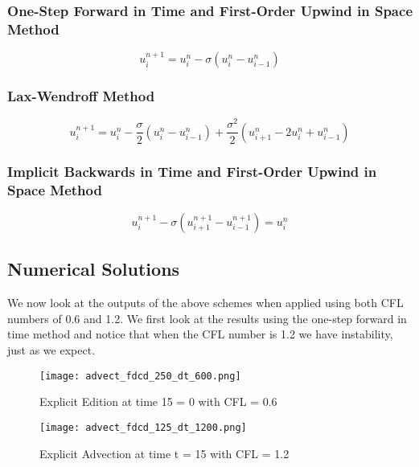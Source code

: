 \documentclass[a4paper,12pt,titlepage]{article}
\newcommand{\scale}{0.5}
\begin{document}
\subsubsection{One-Step Forward in Time and First-Order Upwind in Space Method}
\begin{equation}
u_{i}^{n+1} = u_{i}^n - \sigma (u_i^n-u_{i-1}^n)
\end{equation}

\subsubsection{Lax-Wendroff Method}
\begin{equation}
u_{i}^{n+1} = u_{i}^n - \frac{\sigma}{2} (u_i^n-u_{i-1}^n) + \frac{\sigma^2}{2}(u_{i+1}^n-2u_i^n+u_{i-1}^n)
\end{equation}

\subsubsection{Implicit Backwards in Time and First-Order Upwind in Space Method}
\begin{equation}
u_{i}^{n+1} - \sigma(u_{i+1}^{n+1}-u_{i-1}^{n+1}) = u_i^n
\end{equation}

\subsection{Numerical Solutions}
We now look at the outputs of the above schemes when applied using both CFL numbers of 0.6 and 1.2. 
 We first look at the results using the one-step forward in time method and notice that when the CFL number is 1.2 we have instability, just as we expect.

\begin{figure}[H]
  \begin{center}
    \texttt{[image: advect\_fdcd\_250\_dt\_600.png]}
    \caption{Explicit Edition at time 15 = 0 with CFL = 0.6}
  \end{center}
\end{figure}

\begin{figure}[H]
  \begin{center}
    \texttt{[image: advect\_fdcd\_125\_dt\_1200.png]}
    \caption{Explicit Advection at time t = 15 with CFL = 1.2}
  \end{center}
\end{figure}
\end{document}
